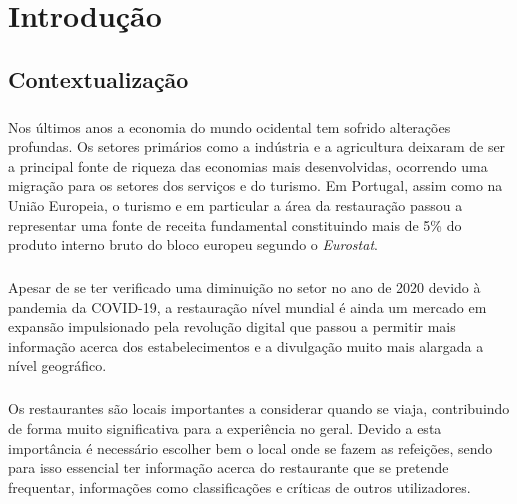 \documentclass[a4paper,12pt]{scrreprt}
\begin{document}
\pagebreak





    \chapter{Introdução}
        \section{Contextualização}
        \paragraph{}
    Nos últimos anos a economia do mundo ocidental tem sofrido alterações profundas. Os setores primários como a indústria e a agricultura deixaram de ser a principal fonte de riqueza das economias mais desenvolvidas, ocorrendo uma migração para os setores dos serviços e do turismo\cite{ine}. Em Portugal, assim como na União Europeia, o turismo e em particular a área da restauração passou a representar uma fonte de receita fundamental constituindo mais de 5\% do produto interno bruto do bloco europeu segundo o \textit{Eurostat}\cite{eurostat}.
        \paragraph{}
	Apesar de se ter verificado uma diminuição no setor no ano de 2020 devido à pandemia da COVID-19, a restauração nível mundial é ainda um mercado em expansão impulsionado pela revolução digital que passou a permitir mais informação acerca dos estabelecimentos e a divulgação muito mais alargada a nível geográfico.
	\paragraph{}
    Os restaurantes são locais importantes a considerar quando se viaja, contribuindo de forma muito significativa para a experiência no geral. Devido a esta importância é necessário escolher bem o local onde se fazem as refeições, sendo para isso essencial ter informação acerca do restaurante que se pretende frequentar, informações como classificações e críticas de outros utilizadores.
\end{document}
